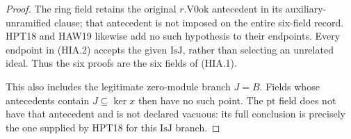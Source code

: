 \begin{proof}
The ring field retains the original \(r.\mathrm{V0ok}\)
antecedent in its auxiliary-unramified clause; that antecedent
is not imposed on the entire six-field record.  HPT18 and
HAW19 likewise add no such hypothesis to their endpoints.
Every endpoint in (HIA.2) accepts the given
\(\mathrm{IsJ}\), rather than selecting an unrelated ideal.
Thus the six proofs are the six fields of (HIA.1).

This also includes the legitimate zero-module branch
\(J=B\).  Fields whose antecedents contain
\(J\subseteq\ker x\) then have no such point.  The
\(\mathrm{pt}\) field does not have that antecedent and is
not declared vacuous: its full conclusion is precisely the
one supplied by HPT18 for this \(\mathrm{IsJ}\) branch.
\end{proof}

